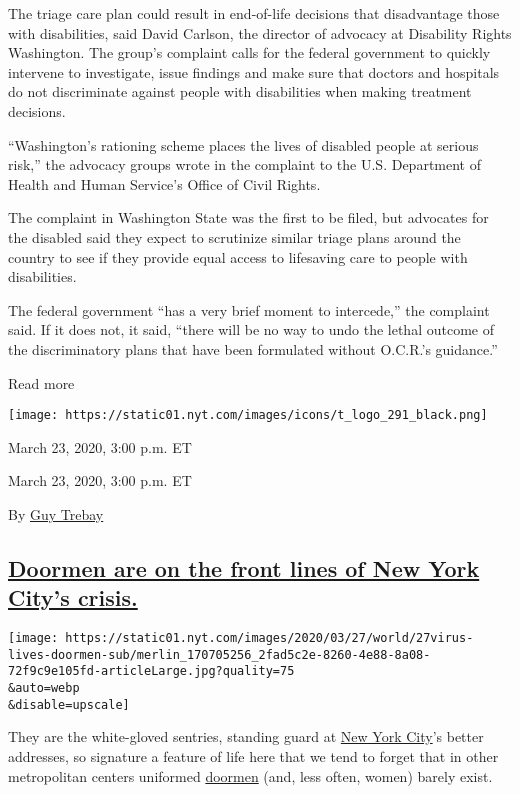 The triage care plan could result in end-of-life decisions that
disadvantage those with disabilities, said David Carlson, the director
of advocacy at Disability Rights Washington. The group's complaint calls
for the federal government to quickly intervene to investigate, issue
findings and make sure that doctors and hospitals do not discriminate
against people with disabilities when making treatment decisions.

``Washington's rationing scheme places the lives of disabled people at
serious risk,'' the advocacy groups wrote in the complaint to the U.S.
Department of Health and Human Service's Office of Civil Rights.

The complaint in Washington State was the first to be filed, but
advocates for the disabled said they expect to scrutinize similar triage
plans around the country to see if they provide equal access to
lifesaving care to people with disabilities.

The federal government ``has a very brief moment to intercede,'' the
complaint said. If it does not, it said, ``there will be no way to undo
the lethal outcome of the discriminatory plans that have been formulated
without O.C.R.'s guidance.''

Read more

\texttt{[image: https://static01.nyt.com/images/icons/t\_logo\_291\_black.png]}

March 23, 2020, 3:00 p.m. ET

March 23, 2020, 3:00 p.m. ET

By \href{https://www.nytimes.com/by/guy-trebay}{Guy Trebay}

\hypertarget{doormen-are-on-the-front-lines-of-new-york-citys-crisis}{%
\subsection{\texorpdfstring{\protect\hyperlink{doormen-are-on-the-front-lines-of-new-york-citys-crisis}{Doormen
are on the front lines of New York City's
crisis.}}{Doormen are on the front lines of New York City's crisis.}}\label{doormen-are-on-the-front-lines-of-new-york-citys-crisis}}

\texttt{[image: https://static01.nyt.com/images/2020/03/27/world/27virus-lives-doormen-sub/merlin\_170705256\_2fad5c2e-8260-4e88-8a08-72f9c9e105fd-articleLarge.jpg?quality=75\\\&auto=webp\\\&disable=upscale]}

They are the white-gloved sentries, standing guard at
\href{https://www.nytimes.com/2020/03/23/nyregion/coronavirus-new-york-update.html\#link-6b4a2a81}{New
York City}'s better addresses, so signature a feature of life here that
we tend to forget that in other metropolitan centers uniformed
\href{https://www.nytimes.com/2020/03/23/style/doormen-coronavirus.html}{doormen}
(and, less often, women) barely exist.

